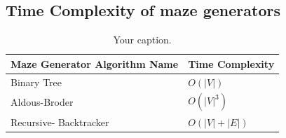 \subsection{Time Complexity of maze generators}

  \begin{table}[!h]
    \begin{center}
  \begin{tabular}{ |p{6cm}||p{3cm}|  }
    \hline
    Maze Generator Algorithm  Name& Time Complexity\\
    \hline
    Binary Tree  & $O(|V|)$\\
    Aldous-Broder& $O(|V|^3)$ \\
    Recursive- Backtracker& $O(|V|+|E|)$\\
    \hline
   \end{tabular}
   \caption{\label{tab:table-name}Your caption.}
  \end{center}
  \end{table}



